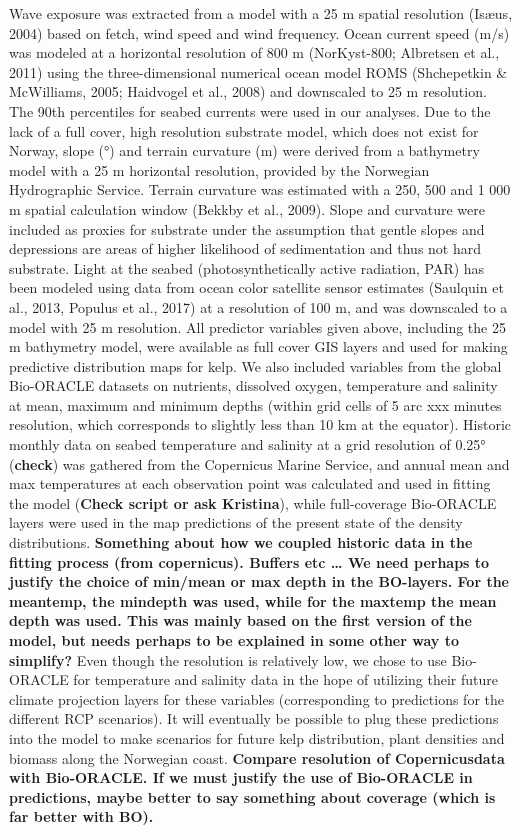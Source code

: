 \documentclass[
]{article}
\begin{document}
Wave exposure was extracted from a model with a 25 m spatial resolution
(Isæus, 2004) based on fetch, wind speed and wind frequency. Ocean
current speed (m/s) was modeled at a horizontal resolution of 800 m
(NorKyst-800; Albretsen et al., 2011) using the three-dimensional
numerical ocean model ROMS (Shchepetkin \& McWilliams, 2005; Haidvogel
et al., 2008) and downscaled to 25 m resolution. The 90th percentiles
for seabed currents were used in our analyses. Due to the lack of a full
cover, high resolution substrate model, which does not exist for Norway,
slope (°) and terrain curvature (m) were derived from a bathymetry model
with a 25 m horizontal resolution, provided by the Norwegian
Hydrographic Service. Terrain curvature was estimated with a 250, 500
and 1 000 m spatial calculation window (Bekkby et al., 2009). Slope and
curvature were included as proxies for substrate under the assumption
that gentle slopes and depressions are areas of higher likelihood of
sedimentation and thus not hard substrate. Light at the seabed
(photosynthetically active radiation, PAR) has been modeled using data
from ocean color satellite sensor estimates (Saulquin et al., 2013,
Populus et al., 2017) at a resolution of 100 m, and was downscaled to a
model with 25 m resolution. All predictor variables given above,
including the 25 m bathymetry model, were available as full cover GIS
layers and used for making predictive distribution maps for kelp. We
also included variables from the global Bio-ORACLE datasets on
nutrients, dissolved oxygen, temperature and salinity at mean, maximum
and minimum depths (within grid cells of 5 arc xxx minutes resolution,
which corresponds to slightly less than 10 km at the equator). Historic
monthly data on seabed temperature and salinity at a grid resolution of
0.25° (\textbf{check}) was gathered from the Copernicus Marine Service,
and annual mean and max temperatures at each observation point was
calculated and used in fitting the model (\textbf{Check script or ask
Kristina}), while full-coverage Bio-ORACLE layers were used in the map
predictions of the present state of the density distributions.
\textbf{Something about how we coupled historic data in the fitting
process (from copernicus). Buffers etc \ldots{} We need perhaps to
justify the choice of min/mean or max depth in the BO-layers. For the
meantemp, the mindepth was used, while for the maxtemp the mean depth
was used. This was mainly based on the first version of the model, but
needs perhaps to be explained in some other way to simplify?} Even
though the resolution is relatively low, we chose to use Bio-ORACLE for
temperature and salinity data in the hope of utilizing their future
climate projection layers for these variables (corresponding to
predictions for the different RCP scenarios). It will eventually be
possible to plug these predictions into the model to make scenarios for
future kelp distribution, plant densities and biomass along the
Norwegian coast. \textbf{Compare resolution of Copernicusdata with
Bio-ORACLE. If we must justify the use of Bio-ORACLE in predictions,
maybe better to say something about coverage (which is far better with
BO).}
\end{document}
